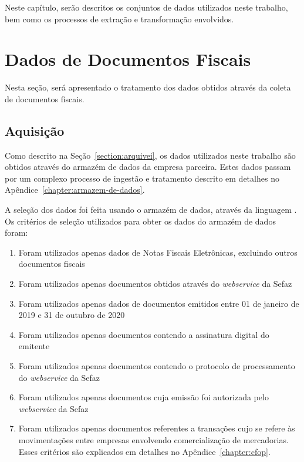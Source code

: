
Neste capítulo, serão descritos os conjuntos de dados utilizados neste trabalho, bem como os processos de extração e transformação envolvidos.

\section{Dados de Documentos Fiscais}

Nesta seção, será apresentado o tratamento dos dados obtidos através da coleta de documentos fiscais.

\subsection{Aquisição}

Como descrito na Seção~\ref{section:arquivei}, os dados utilizados neste trabalho são obtidos através do armazém de dados da empresa parceira. Estes dados passam por um complexo processo de ingestão e tratamento descrito em detalhes no Apêndice~\ref{chapter:armazem-de-dados}.

A seleção dos dados foi feita usando o armazém de dados, através da linguagem . Os critérios de seleção utilizados para obter os dados do armazém de dados foram:

\begin{enumerate}
    \item Foram utilizados apenas dados de Notas Fiscais Eletrônicas, excluindo outros documentos fiscais
    \item Foram utilizados apenas documentos obtidos através do \textit{webservice} da Sefaz
    \item Foram utilizados apenas dados de documentos emitidos entre 01 de janeiro de 2019 e 31 de outubro de 2020
    \item Foram utilizados apenas documentos contendo a assinatura digital do emitente
    \item Foram utilizados apenas documentos contendo o protocolo de processamento do \textit{webservice} da Sefaz
    \item Foram utilizados apenas documentos cuja emissão foi autorizada pelo \textit{webservice} da Sefaz
    \item Foram utilizados apenas documentos referentes a transações cujo  se refere às movimentações entre empresas envolvendo comercialização de mercadorias. Esses critérios são explicados em detalhes no Apêndice~\ref{chapter:cfop}.
\end{enumerate}

